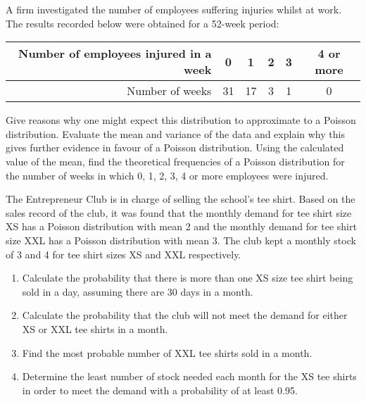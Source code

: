 \begin{problem}
    A firm investigated the number of employees suffering injuries whilst at work. The results recorded below were obtained for a 52-week period:

    \begin{table}[H]
        \centering
        \begin{tabular}{|r|c|c|c|c|c|}
        \hline
        Number of employees injured in a week & 0 & 1 & 2 & 3 & 4 or more \\ \hline
        Number of weeks & 31 & 17 & 3 & 1 & 0 \\ \hline
        \end{tabular}
    \end{table}

    Give reasons why one might expect this distribution to approximate to a Poisson distribution. Evaluate the mean and variance of the data and explain why this gives further evidence in favour of a Poisson distribution. Using the calculated value of the mean, find the theoretical frequencies of a Poisson distribution for the number of weeks in which 0, 1, 2, 3, 4 or more employees were injured.
\end{problem}

\begin{problem}[\chili]
    The Entrepreneur Club is in charge of selling the school's tee shirt. Based on the sales record of the club, it was found that the monthly demand for tee shirt size XS has a Poisson distribution with mean 2 and the monthly demand for tee shirt size XXL has a Poisson distribution with mean 3. The club kept a monthly stock of 3 and 4 for tee shirt sizes XS and XXL respectively.

    \begin{enumerate}
        \item Calculate the probability that there is more than one XS size tee shirt being sold in a day, assuming there are 30 days in a month.
        \item Calculate the probability that the club will not meet the demand for either XS or XXL tee shirts in a month.
        \item Find the most probable number of XXL tee shirts sold in a month.
        \item Determine the least number of stock needed each month for the XS tee shirts in order to meet the demand with a probability of at least 0.95.
    \end{enumerate}
\end{problem}